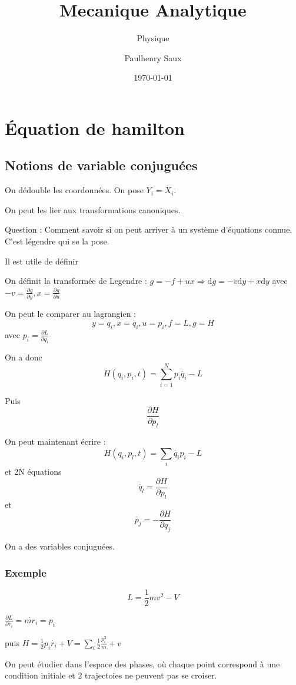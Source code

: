 \documentclass[french]{yLectureNote}
\title{Mecanique Analytique}
\subtitle{Physique}
\author{Paulhenry Saux}
\date{\today}
\newcommand{\dd}{\mathrm{d}}
\begin{document}
\chapter{Équation de hamilton}
\section{Notions de variable conjuguées}
On dédouble les coordonnées. On pose $Y_i = \dot{X_i}$.

On peut les lier aux transformations canoniques.

Question : Comment savoir si on peut arriver à un système d'équations connue. C'est légendre qui se la pose.

Il est utile de définir


On définit la transformée de Legendre : $g = -f+ux \Rightarrow \dd g = -v\dd y+x\dd y$
avec $-v = \frac{\partial g}{\partial y}, x = \frac{\partial g}{\partial u}$

On peut le comparer au lagrangien :
$$y = q_i, x = \dot{q_i}, u= p_i, f = L, g = H$$ avec $p_i = \frac{\partial L}{\partial \dot{q_i}}$

On a donc $$H(q_i, p_i, t) = \sum^N_{i=1}p_i\dot{q_i} - L$$

Puis $$\frac{\partial H}{\partial p_l}$$

On peut maintenant écrire :
$$H(q_i, p_l,t) = \sum_i \dot{q_i}p_i -L$$ et 2N équations 
$$\dot{q_l} = \frac{\partial H}{\partial p_l}$$ et $$\dot{p_j} = -\frac{\partial H}{\partial q_j}$$

On a des variables conjuguées.

\subsection{Exemple}
$$L = \frac12 m v^2 - V$$

$\frac{\partial L}{\partial \dot{r_i}} = \dot{mr_i} = p_i $

puis $H = \frac12 p_i \dot{r_i}+V = \sum_i \frac12 \frac{p_i^2}{m}+v$

On peut étudier dans l'espace des phases, où chaque point correspond à une condition initiale et 2 trajectoies ne peuvent pas se croiser.

\end{document}
